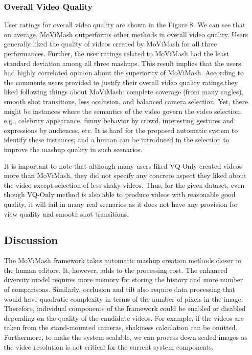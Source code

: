 \documentclass{sig-alternate}
\begin{document}
\subsubsection{ Overall Video Quality}
User ratings for overall video quality are shown in the Figure 8. We can see that on average, MoViMash outperforms other methods in overall video quality. Users generally liked the quality of videos created by MoViMash for all three performances. Further, the user ratings related to MoViMash had the least standard deviation among all three mashups. This result implies that the users had highly correlated opinion about the superiority of MoViMash. According to the comments users provided to justify their overall video quality ratings,they liked following things about MoViMash: complete coverage (from many angles), smooth shot transitions, less occlusion, and balanced camera selection. Yet, there might be instances where the semantics of the video govern the video selection, e.g., celebrity appearance, funny behavior by crowd, interesting gestures and expressions by audiences, etc. It is hard for the proposed automatic system to identify these instances; and a human can be introduced in the selection to improve the mashup quality in such scenarios.

It is important to note that although many users liked VQ-Only created videos more than MoViMash, they did not specify any concrete aspect they liked about the video except selection of less shaky videos. Thus, for the given dataset, even though VQ-Only method is also able to produce videos with reasonable good quality, it will fail in many real scenarios as it does not have any provision for view quality and smooth shot transitions. 
\subsection{Discussion}
The MoViMash framework takes automatic mashup creation methods closer to the human editors. It, however, adds to the processing cost. The enhanced diversity model requires more memory for storing the history and more number of comparisons. Similarly, occlusion and tilt also require data processing that would have quadratic complexity in terms of the number of pixels in the image. Therefore, individual components of the framework could be enabled or disabled depending on the quality of the candidate videos. For example, if the videos are taken from the stand-mounted cameras, shakiness calculation can be omitted. Furthermore, to make the system scalable, we can process down scaled images as the video resolution is not critical for the current system components.
\end{document}
